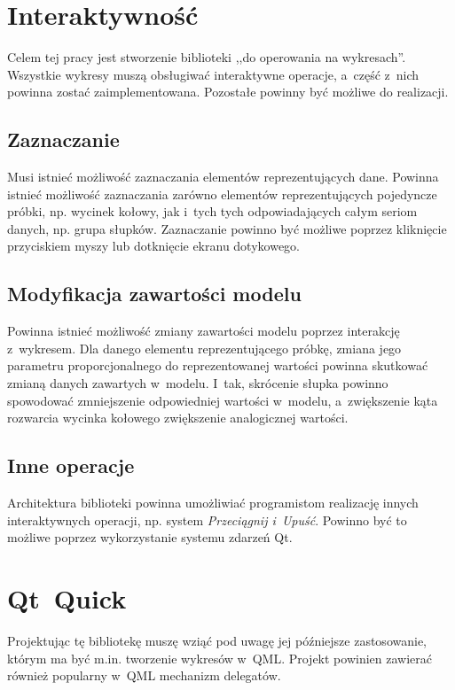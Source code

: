 \section{Interaktywność}
Celem tej pracy jest stworzenie biblioteki ,,do operowania na wykresach''. Wszystkie wykresy muszą obsługiwać interaktywne operacje, a~część z~nich powinna zostać zaimplementowana. Pozostałe powinny być możliwe do realizacji.

\subsection{Zaznaczanie}
Musi istnieć możliwość zaznaczania elementów reprezentujących dane. Powinna istnieć możliwość zaznaczania zarówno elementów reprezentujących pojedyncze próbki, np. wycinek kołowy, jak i~tych tych odpowiadających całym seriom danych, np. grupa słupków. Zaznaczanie powinno być możliwe poprzez kliknięcie przyciskiem myszy lub dotknięcie ekranu dotykowego.

\subsection{Modyfikacja zawartości modelu}
Powinna istnieć możliwość zmiany zawartości modelu poprzez interakcję z~wykresem. Dla danego elementu reprezentującego próbkę, zmiana jego parametru proporcjonalnego do reprezentowanej wartości powinna skutkować zmianą danych zawartych w~modelu. I~tak, skrócenie słupka powinno spowodować zmniejszenie odpowiedniej wartości w~modelu, a~zwiększenie kąta rozwarcia wycinka kołowego zwiększenie analogicznej wartości.

\subsection{Inne operacje}
Architektura biblioteki powinna umożliwiać programistom realizację innych interaktywnych operacji, np. system \textit{Przeciągnij i~Upuść}. Powinno być to możliwe poprzez wykorzystanie systemu zdarzeń Qt.



\section{Qt~Quick}
Projektując tę bibliotekę muszę wziąć pod uwagę jej późniejsze zastosowanie, którym ma być m.in. tworzenie wykresów w~QML. Projekt powinien zawierać również popularny w~QML mechanizm delegatów.

